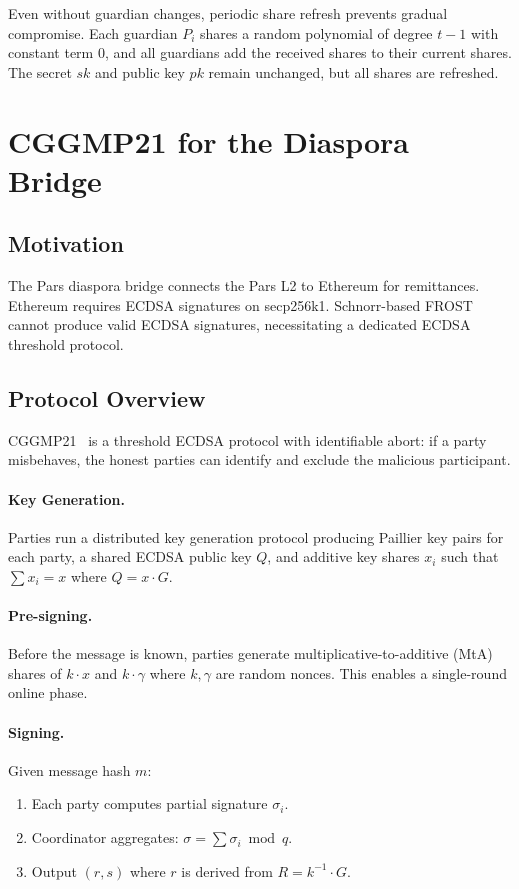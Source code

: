 \documentclass[11pt,a4paper]{article}
\begin{document}
Even without guardian changes, periodic share refresh prevents gradual
compromise.  Each guardian $P_i$ shares a random polynomial of degree
$t-1$ with constant term $0$, and all guardians add the received shares
to their current shares.  The secret $sk$ and public key $pk$ remain
unchanged, but all shares are refreshed.

\section{CGGMP21 for the Diaspora Bridge}
\label{sec:cggmp}

\subsection{Motivation}

The Pars diaspora bridge connects the Pars L2 to Ethereum for
remittances.  Ethereum requires ECDSA signatures on secp256k1.
Schnorr-based FROST cannot produce valid ECDSA signatures, necessitating
a dedicated ECDSA threshold protocol.

\subsection{Protocol Overview}

CGGMP21~\cite{canetti2021cggmp} is a threshold ECDSA protocol with
identifiable abort: if a party misbehaves, the honest parties can
identify and exclude the malicious participant.

\paragraph{Key Generation.}
Parties run a distributed key generation protocol producing Paillier
key pairs for each party, a shared ECDSA public key $Q$, and additive
key shares $x_i$ such that $\sum x_i = x$ where $Q = x \cdot G$.

\paragraph{Pre-signing.}
Before the message is known, parties generate multiplicative-to-additive
(MtA) shares of $k \cdot x$ and $k \cdot \gamma$ where $k, \gamma$ are
random nonces.  This enables a single-round online phase.

\paragraph{Signing.}
Given message hash $m$:
\begin{enumerate}
    \item Each party computes partial signature $\sigma_i$.
    \item Coordinator aggregates: $\sigma = \sum \sigma_i \bmod q$.
    \item Output $(r, s)$ where $r$ is derived from $R = k^{-1} \cdot G$.
\end{enumerate}
\end{document}
